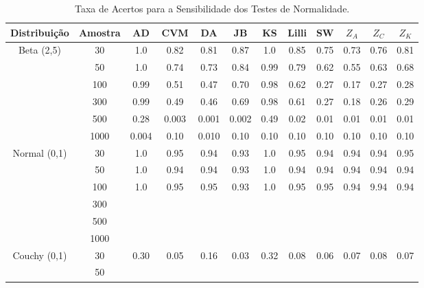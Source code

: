 \documentclass[final]{beamer}
\begin{document}
\begin{frame}[t]
\begin{columns}[t,totalwidth=0.6\paperwidth]
\begin{column}{0.45\paperwidth}
\begin{table}[H]
    \centering
    \caption{Taxa de Acertos para a Sensibilidade dos Testes de Normalidade.}
    \begin{tabular}{c|c|c|c|c|c|c|c|c|c|c|c}
    \hline \hline
Distribuição              & Amostra &   AD  & CVM  &  DA   & JB   &  KS   & Lilli &  SW  & $Z_{A}$ & $Z_{C}$ & $Z_{K}$ \\
    \hline
\multirow{6}{*}{Beta (2,5)} 
                & 30    & 1.0   & 0.82 & 0.81  & 0.87 &  1.0  &  0.85  &  0.75 &  0.73  & 0.76   & 0.81   \\
                & 50    & 1.0   & 0.74 & 0.73  & 0.84 &  0.99 &  0.79  &  0.62 &  0.55  & 0.63   & 0.68   \\
                & 100   & 0.99  & 0.51 & 0.47  & 0.70 &  0.98 &  0.62  &  0.27 &  0.17  & 0.27   & 0.28   \\
                & 300   & 0.99  & 0.49 & 0.46  & 0.69 &  0.98 &  0.61  &  0.27 &  0.18  & 0.26   & 0.29    \\
                & 500   & 0.28  & 0.003 & 0.001  & 0.002 & 0.49  & 0.02 & 0.01  & 0.01  & 0.01   & 0.01     \\
                & 1000  & 0.004  & 0.10  & 0.010  & 0.10 & 0.10  & 0.10  & 0.10  & 0.10  & 0.10  & 0.10       \\
\hline\hline
\multirow{6}{*}{Normal (0,1)}   
               & 30     & 1.0   & 0.95  & 0.94  & 0.93 &  1.0  &  0.95  & 0.94  &  0.94  &  0.94  & 0.95   \\
               &  50    & 1.0   & 0.94  &  0.94 & 0.93 &  1.0  &  0.94  & 0.94  &  0.94  &  0.94  & 0.94    \\
               & 100    & 1.0   &  0.95 &  0.95 & 0.93 &  1.0  &  0.95  & 0.95  &  0.94  &  9.94  & 0.94   \\
               & 300    &       &       &       &      &       &        &       &        &        &        \\
               & 500    &       &       &       &      &       &        &       &        &        &        \\
               & 1000   &       &       &       &      &       &        &       &        &        &        \\  
\hline\hline
\multirow{6}{*}{Couchy (0,1)}     
               & 30     &  0.30 & 0.05  &  0.16 & 0.03 &  0.32 &  0.08  & 0.06  & 0.07   & 0.08   & 0.07   \\
               & 50     &       &       &       &      &       &        &       &         &         &        \\

\end{tabular}
\end{table}
\end{column}
\end{columns}
\end{frame}
\end{document}
